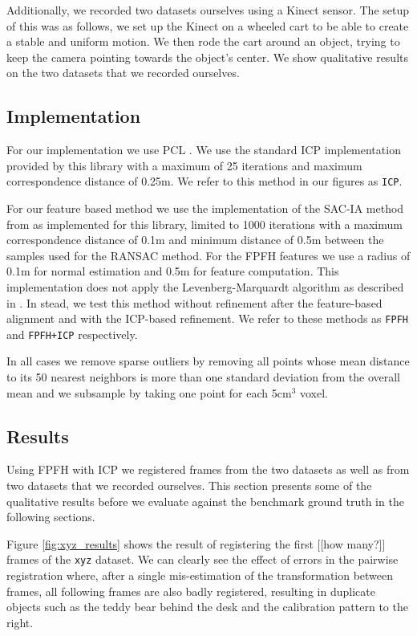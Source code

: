\documentclass[a4paper]{article}
\begin{document}
Additionally, we recorded two datasets ourselves using a Kinect sensor. The setup of this was as follows, we set up the Kinect on a wheeled cart to be able to create a stable and uniform motion. We then rode the cart around an object, trying to keep the camera pointing towards the object's center. We show qualitative results on the two datasets that we recorded ourselves.

\subsection{Implementation}

For our implementation we use \ac{PCL} \cite{Rusu_ICRA2011_PCL}. We use the standard \ac{ICP} implementation provided by this library with a maximum of 25 iterations and maximum correspondence distance of 0.25m. We refer to this method in our figures as \texttt{ICP}.

 For our feature based method we use the implementation of the \ac{SAC-IA} method from \cite{rusu2009fast} as implemented for this library, limited to 1000 iterations with a maximum correspondence distance of 0.1m and minimum distance of 0.5m between the samples used for the \ac{RANSAC} method. For the \ac{FPFH} features we use a radius of 0.1m for normal estimation and 0.5m for feature computation. This implementation does not apply the Levenberg-Marquardt algorithm as described in \cite{rusu2009fast}. In stead, we test this method without refinement after the feature-based alignment and with the ICP-based refinement. We refer to these methods as \texttt{FPFH} and \texttt{FPFH+ICP} respectively.
 
 In all cases we remove sparse outliers by removing all points whose mean distance to its 50 nearest neighbors is more than one standard deviation from the overall mean and we subsample by taking one point for each 5cm$^3$ voxel.


\subsection{Results}

Using \ac{FPFH} with \ac{ICP} we registered frames from the two datasets as well as from two datasets that we recorded ourselves. This section presents some of the qualitative results before we evaluate against the benchmark ground truth in the following sections.

Figure \ref{fig:xyz_results} shows the result of registering the first [[how many?]] frames of the \texttt{xyz} dataset. We can clearly see the effect of errors in the pairwise registration where, after a single mis-estimation of the transformation between frames, all following frames are also badly registered, resulting in duplicate objects such as the teddy bear behind the desk and the calibration pattern to the right.
\end{document}
